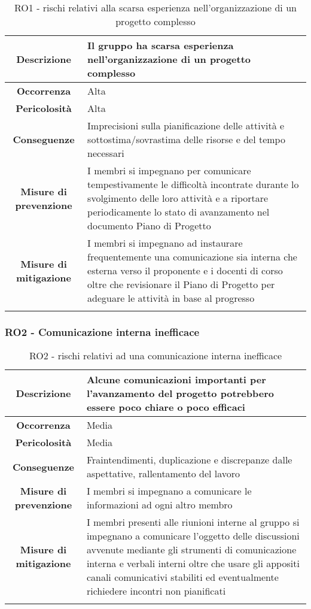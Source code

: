  
\begin{longtable}{|c|p{12cm}|}
\hline
\textbf{Descrizione} & Il gruppo ha scarsa esperienza nell'organizzazione di un progetto complesso \\
\hline
\textbf{Occorrenza} & Alta \\
\hline
\textbf{Pericolosità} & Alta \\
\hline
\textbf{Conseguenze} & Imprecisioni sulla pianificazione delle attività e sottostima/sovrastima delle risorse e del tempo necessari\\
\hline
\textbf{Misure di prevenzione} & I membri si impegnano per comunicare tempestivamente le difficoltà incontrate durante lo svolgimento delle loro attività e a riportare periodicamente lo stato di avanzamento nel documento Piano di Progetto \\
\hline
\textbf{Misure di mitigazione} & I membri si impegnano ad instaurare frequentemente una comunicazione sia interna che esterna verso il proponente e i docenti di corso oltre che revisionare il Piano di Progetto per adeguare le attività in base al progresso\\
\hline
\caption{RO1 - rischi relativi alla scarsa esperienza nell'organizzazione di un progetto complesso}
\end{longtable}

%
%
\subsubsection[RO2]{RO2 - Comunicazione interna inefficace}\label{ro:2}
\begin{longtable}{|c|p{12cm}|}
\hline
\textbf{Descrizione} & Alcune comunicazioni importanti per l'avanzamento del progetto potrebbero essere poco chiare o poco efficaci\\
\hline
\textbf{Occorrenza} & Media \\
\hline
\textbf{Pericolosità} & Media \\
\hline
\textbf{Conseguenze} & Fraintendimenti, duplicazione e discrepanze dalle aspettative, rallentamento del lavoro \\
\hline
\textbf{Misure di prevenzione} & I membri si impegnano a comunicare le informazioni ad ogni altro membro \\
\hline
\textbf{Misure di mitigazione} & I membri presenti alle riunioni interne al gruppo si impegnano a comunicare l'oggetto delle discussioni avvenute mediante gli strumenti di comunicazione interna e verbali interni oltre che usare gli appositi canali comunicativi stabiliti ed eventualmente richiedere incontri non pianificati\\
\hline
\caption{RO2 - rischi relativi ad una comunicazione interna inefficace}
\end{longtable}


